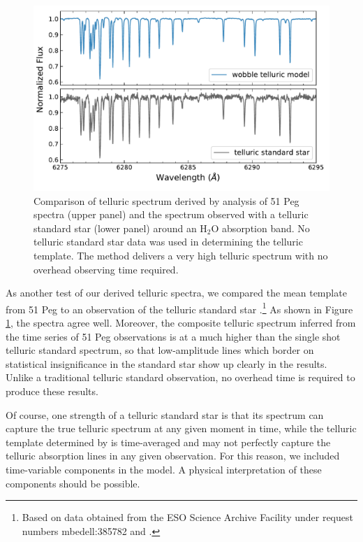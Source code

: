 \documentclass[modern]{aastex62}
\begin{document}
\begin{figure}
\centering
\includegraphics[width=5in]{telluric_standard}
\caption{Comparison of telluric spectrum derived by \wobble analysis of 51 Peg spectra (upper panel) and the spectrum observed with a telluric standard star (lower panel) around an H$_2$O absorption band. No telluric standard star data was used in determining the \wobble telluric template. The \wobble method delivers a very high \SNR telluric spectrum with no overhead observing time required.}
\label{fig:telluric_standard}
\end{figure}

As another test of our derived telluric spectra, we compared the mean template from 51 Peg to an observation of the telluric standard star .\footnote{Based on data obtained from the ESO Science Archive Facility under request numbers mbedell:385782 and .}
As shown in Figure \ref{fig:telluric_standard}, the spectra agree well. 
Moreover, the composite telluric spectrum inferred from the time series of 51 Peg observations is at a much higher \SNR than the single shot telluric standard spectrum, so that low-amplitude lines which border on statistical insignificance in the standard star show up clearly in the \wobble results. 
Unlike a traditional telluric standard observation, no overhead time is required to produce these results.

Of course, one strength of a telluric standard star is that its spectrum can capture the true telluric spectrum at any given moment in time, while the telluric template determined by \wobble is time-averaged and may not perfectly capture the telluric absorption lines in any given observation. 
For this reason, we included time-variable components in the model. 
A physical interpretation of these components should be possible.
\end{document}
